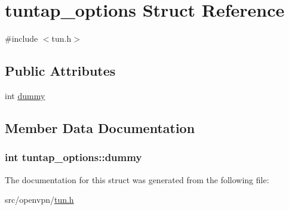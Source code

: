\hypertarget{structtuntap__options}{}\section{tuntap\+\_\+options Struct Reference}
\label{structtuntap__options}


{\ttfamily \#include $<$tun.\+h$>$}

\subsection*{Public Attributes}
\begin{DoxyCompactItemize}
\item 
int \hyperlink{structtuntap__options_a3139ab89773f6dd64a06359ed553f133}{dummy}
\end{DoxyCompactItemize}


\subsection{Member Data Documentation}
\hypertarget{structtuntap__options_a3139ab89773f6dd64a06359ed553f133}{}
\subsubsection[{dummy}]{\setlength{\rightskip}{0pt plus 5cm}int tuntap\+\_\+options\+::dummy}\label{structtuntap__options_a3139ab89773f6dd64a06359ed553f133}


The documentation for this struct was generated from the following file\+:\begin{DoxyCompactItemize}
\item 
src/openvpn/\hyperlink{tun_8h}{tun.\+h}\end{DoxyCompactItemize}

